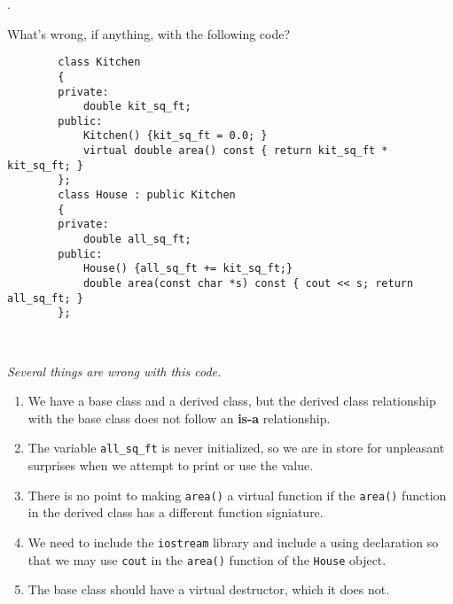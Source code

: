 \documentclass{amsart}
\begin{document}
. 
\begin{minipage}[t]{11.5 cm}
	What's wrong, if anything, with the following code?
	\begin{verbatim}
		class Kitchen
		{
		private:
		    double kit_sq_ft;
		public:
		    Kitchen() {kit_sq_ft = 0.0; }
		    virtual double area() const { return kit_sq_ft * kit_sq_ft; }
		};
		class House : public Kitchen
		{
		private:
		    double all_sq_ft;
		public:
		    House() {all_sq_ft += kit_sq_ft;}
		    double area(const char *s) const { cout << s; return all_sq_ft; }
		};
	\end{verbatim}
\end{minipage} \\[1ex]
\phantom{3. } 
\begin{minipage}[t]{11.5 cm}
	{\slshape 
	Several things are wrong with this code.
	\begin{enumerate}
		\item 
		We have  a base class and a derived class, but the
		derived class relationship with the base class does not follow
		an \textbf{is-a} relationship.

		\item
		The variable \verb+all_sq_ft+ is never initialized, so
		we are in store for unpleasant surprises when we attempt to
		print or use the value.

		\item
		There is no point to making \verb+area()+ a virtual
		function if the \verb+area()+ function in the derived class
		has a different function signiature. 

		\item
		We need to include the \verb+iostream+ library and include
		a using declaration so that we may use \verb+cout+ in the
		\verb+area()+ function of the \verb+House+ object.

		\item	
		The base class should have a virtual destructor,
		which it does not.
	\end{enumerate}
	}  
\end{minipage} 
	
\end{document}

